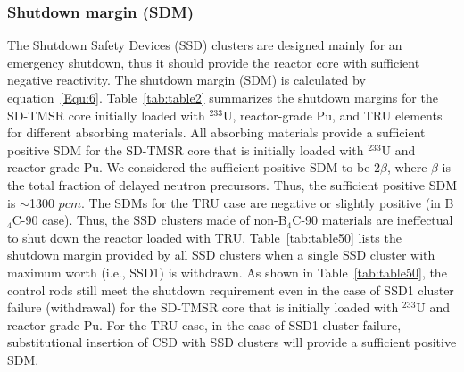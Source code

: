 \subsubsection{Shutdown margin (SDM)}

The Shutdown Safety Devices (SSD) clusters are designed mainly for an emergency shutdown, thus it should 
provide the reactor core with sufficient negative reactivity. The 
shutdown margin (SDM) is calculated by equation~\ref{Equ:6}.
Table~\ref{tab:table2} summarizes the shutdown margins for the SD-TMSR core 
initially loaded with $^{233}$U, reactor-grade Pu, and TRU 
elements for different absorbing materials. All absorbing materials provide a sufficient positive SDM for the SD-TMSR core that is initially loaded with $^{233}$U and reactor-grade Pu. We considered the sufficient positive SDM to be 2$\beta$, where $\beta$ is the total fraction of delayed neutron precursors. Thus, the sufficient positive SDM is $\sim$1300 $pcm$. The SDMs for the TRU case are negative or slightly positive (in B$_4$C-90 case). Thus, the SSD clusters made of non-B$_4$C-90 materials are ineffectual to shut down the reactor loaded with TRU. Table~\ref{tab:table50} lists the shutdown margin provided by all SSD clusters when a single SSD cluster with maximum worth (i.e., SSD1) is withdrawn. As shown in Table~\ref{tab:table50}, the control rods still meet the shutdown requirement even in the case of SSD1 cluster failure (withdrawal) for the SD-TMSR core that is initially loaded with $^{233}$U and reactor-grade Pu. For the TRU case, in the case of SSD1 cluster failure, substitutional insertion of CSD with SSD clusters will provide a sufficient positive SDM. 

